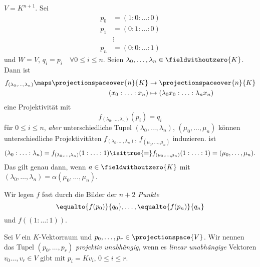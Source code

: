 \begin{beispiel*}
  \( V=K^{n+1} \). Sei 
  \begin{align*}
    p_0&=(1:0:\dotsc:0)\\
    p_1&=(0:1:\dotsc:0)\\
    &\vdots\\
    p_n&=(0:0:\dotsc:1)
  \end{align*}
  und \( W=V \), \( q_i=p_i\quad \forall 0\leq i\leq n \). Seien \( \lambda_0,\dotsc,\lambda_n\in \fieldwithoutzero{K} \). Dann ist
  \begin{equation*}
    \begin{split}
      f_{(\lambda_0,\dotsc,\lambda_n)}\maps \projectionspaceover{n}{K}&\to \projectionspaceover{n}{K}\\
      (x_0:\dotsc:x_n)&\mapsto (\lambda_0 x_0:\dotsc:\lambda_n x_n)
    \end{split}
  \end{equation*}
  eine Projektivität mit 
  \begin{equation*}
    f_{(\lambda_0,\dotsc,\lambda_n)}(p_i)=q_i
  \end{equation*}
  für \( 0\leq i\leq n \), \emph{aber} unterschiedliche Tupel
   \( (\lambda_0,\dotsc,\lambda_n)\), \( (\mu_0,\dotsc,\mu_n) \) können unterschiedliche Projektivitäten \( f_{(\lambda_0,\dotsc,\lambda_n)} \), \( f_{(\mu_0,\dotsc,\mu_n)} \) induzieren. \Zb ist 
   \begin{equation*}
    (\lambda_0:\dotsc:\lambda_n)=f_{(\lambda_0,\dotsc,\lambda_n)}(1:\dotsc:1)\isittrue{=}f_{(\mu_0,\dotsc,\mu_n)}(1:\dotsc:1)=(\mu_0,\dotsc,\mu_n).
   \end{equation*}
   Das gilt genau dann, wenn \texists \( a\in \fieldwithoutzero{K}  \) mit \( (\lambda_0,\dotsc,\lambda_n)=\alpha (\mu_0,\dotsc,\mu_n) \).
\end{beispiel*}
\begin{idee*}
  Wir legen \( f  \) fest durch die Bilder der \emph{\( n+2 \) Punkte}
  \begin{equation*}
    \equalto{f(p_0)}{q_0},\dotsc,\equalto{f(p_n)}{q_n}
  \end{equation*}
  und \( f((1:\dotsc:1)) \).
\end{idee*}
\begin{definition*}
  Sei \( V \) ein \( K \)-Vektorraum und \( p_0,\dotsc,p_r\in \projectionspace{V} \). Wir nennen das Tupel \( (p_0,\dotsc,p_r) \) \emph{projektiv unabhängig}, wenn es \emph{linear unabhängige} Vektoren \( v_0\dotsc,v_r\in V \) gibt mit \( p_i=K v_i \), \( 0\leq i\leq r \).
\end{definition*}
